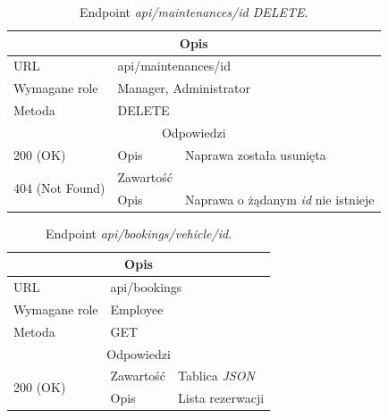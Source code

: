 \documentclass[eng,printmode,openany]{mgr}
\begin{document}
	\begin{table}[H]
		\caption{Endpoint \textit{api/maintenances/id DELETE}.}
		\begin{tabularx}{\textwidth}{|l|l|X|}
			\hline
			\multicolumn{3}{|c|}{Opis}
			\\ \hline
			URL                       & \multicolumn{2}{l|}{api/maintenances/id}
			\\ \hline
			Wymagane role             & \multicolumn{2}{l|}{Manager, Administrator}
			\\ \hline
			Metoda                    & \multicolumn{2}{l|}{DELETE}
			\\ \hline
			\multicolumn{3}{|c|}{Odpowiedzi}
			\\ \hline
			200 (OK)			                & Opis         	& Naprawa została usunięta
			\\ \hline
			\multirow{2}{*}{404 (Not Found)} 	& Zawartość     & 
			\\ \cline{2-3}                      & Opis          & Naprawa o żądanym \textit{id} nie istnieje
			\\ \hline
		\end{tabularx}
	\end{table}
	
	\begin{table}[H]
		\caption{Endpoint \textit{api/bookings/vehicle/id}.}
		\begin{tabularx}{\textwidth}{|l|l|X|}
			\hline
			\multicolumn{3}{|c|}{Opis}
			\\ \hline
			URL                         & \multicolumn{2}{l|}{api/bookings}
			\\ \hline
			Wymagane role               & \multicolumn{2}{l|}{Employee}
			\\ \hline
			Metoda                      & \multicolumn{2}{l|}{GET}
			\\ \hline
			\multicolumn{3}{|c|}{ Odpowiedzi}
			\\ \hline
			\multirow{2}{*}{200 (OK)}   & Zawartość         & Tablica \textit{JSON}
			\\ \cline{2-3}              & Opis         	    & Lista rezerwacji
			\\ \hline
		\end{tabularx}
	\end{table}
	
\end{document}
